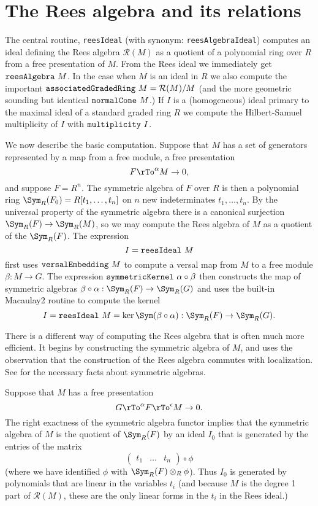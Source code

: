 \documentclass[twoside,12pt, leqno]{amsart}
\def\RR{{\mathcal R}}
\begin{document}
\section{The Rees algebra and its relations}

\noindent The central routine, {\tt reesIdeal} (with synonym: {\tt reesAlgebraIdeal}) computes an ideal
defining the Rees algebra $\RR(M)$ as a quotient of a polynomial ring over $R$ from a free presentation of $M$. From the Rees ideal we immediately get
${\tt reesAlgebra}\ M$. In the case when $M$ is an ideal in $R$ we also compute
the important ${\tt associatedGradedRing\ }M = \RR(M)/M$ (and the more geometric sounding but identical ${\tt normalCone\ }M$.)  
If $I$ is a (homogeneous) ideal primary to the
maximal ideal of a standard graded ring $R$ we compute the
Hilbert-Samuel multiplicity of $I$ with ${\tt multiplicity\ }I$.

We now describe the basic computation. Suppose that $M$ has 
a set of generators represented by a map from a free module,
a free presentation
$$
 F\rTo^\alpha M\to 0,
$$
and suppose  $F = R^n$. The symmetric algebra of $F$ over $R$ is then a polynomial ring
$\Sym_R(F_0) = R[t_1,\dots, t_n]$ on $n$ new indeterminates $t_1,\dots, t_n$. By the universal
property of the symmetric algebra there is a canonical surjection
$\Sym_R(F)\rightarrow \Sym_R(M)$, so we may compute the Rees algebra of $M$ as
a quotient of the  $\Sym_R(F)$. The expression
$$
I = {\tt reesIdeal}\ M
$$
first uses ${\tt versalEmbedding\ }M$ to compute a versal map from $M$ to a free module $\beta: M\to G$. The expression ${\tt symmetricKernel\ } \alpha\circ\beta$  then constructs the map of symmetric algebras $\beta\circ \alpha:\Sym_R(F)\to \Sym_R(G)$ and uses
 the built-in Macaulay2 routine to compute the kernel 
$$
I = {\tt reesIdeal\ }M = \ker \Sym(\beta\circ\alpha): \Sym_R(F) \to \Sym_R(G).
$$

There is a different way of computing the Rees algebra that is often much more efficient. It begins by constructing the symmetric algebra of $M$, and uses the observation that the construction of the Rees algebra commutes with localization. See \cite[Appendix 2]{E} for the necessary facts about symmetric algebras.

Suppose that $M$ has a free presentation
$$
G\rTo^\alpha F\rTo^\epsilon M\to 0.
$$
The right exactness of the symmetric algebra functor implies that the symmetric algebra of $M$ is the quotient of $\Sym_R(F)$ by an ideal $I_0$ that is
generated by the
entries of the matrix
$$
\begin{pmatrix}
 t_1&\dots&t_n
 \end{pmatrix}
 \circ \phi
$$
(where we have identified $\phi$ with $\Sym_R(F)\otimes_R\phi$).
Thus $I_0$ is generated by polynomials that are linear in the variables $t_i$ (and because
$M$ is the degree 1 part of $\RR(M)$, these are the only linear forms in the $t_i$ in the
Rees ideal.)
\end{document}
